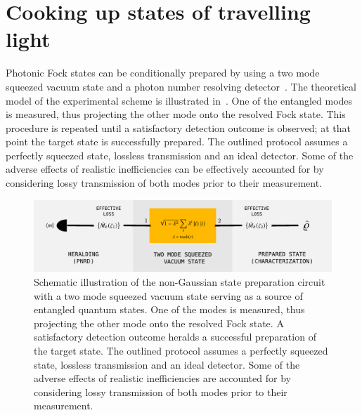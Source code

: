 \documentclass{article}
\begin{document}
%
%

\section{Cooking up states of travelling light}

Photonic Fock states can be conditionally prepared by using a two mode squeezed vacuum state and a photon number resolving detector~\cite{yukawa2013a,yoshikawa2018,tiedau2019,provaznik2020}. The theoretical model of the experimental scheme is illustrated in~. One of the entangled modes is measured, thus projecting the other mode onto the resolved Fock state. This procedure is repeated until a satisfactory detection outcome is observed; at that point the target state is successfully prepared. The outlined protocol assumes a perfectly squeezed state, lossless transmission and an ideal detector. Some of the adverse effects of realistic inefficiencies can be effectively accounted for by considering lossy transmission of both modes prior to their measurement.

\begin{figure}[h]
  \begin{center}
    \includegraphics[width = 1.00 \columnwidth]{import/illustrate_scheme_alt.pdf}
  \end{center}
  \caption{
    Schematic illustration of the non-Gaussian state preparation circuit with a two mode squeezed vacuum state serving as a source of entangled quantum states. One of the modes is measured, thus projecting the other mode onto the resolved Fock state. A satisfactory detection outcome heralds a successful preparation of the target state. The outlined protocol assumes a perfectly squeezed state, lossless transmission and an ideal detector. Some of the adverse effects of realistic inefficiencies are accounted for by considering lossy transmission of both modes prior to their measurement.
  }
  \label{f-scheme}
\end{figure}
\end{document}
